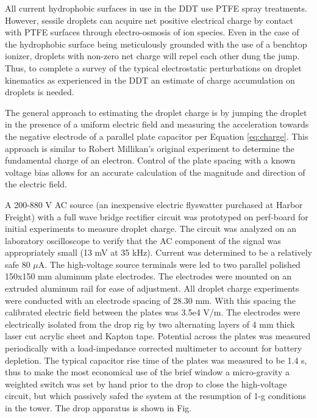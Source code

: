 \documentclass{jfm}
\begin{document}
All current hydrophobic surfaces in use in the DDT use PTFE spray treatments. However, sessile droplets can acquire net positive electrical charge by contact with PTFE surfaces through electro-osmosis of ion species. Even in the case of the hydrophobic surface being meticulously grounded with the use of a benchtop ionizer, droplets with non-zero net charge will repel each other dung the jump. Thus, to complete a survey of the typical electrostatic perturbations on droplet kinematics as experienced in the DDT an estimate of charge accumulation on droplets is needed.

The general approach to estimating the droplet charge is by jumping the droplet in the presence of a uniform electric field and measuring the acceleration towards the negative electrode of a parallel plate capacitor per Equation \ref{eq:charge}. This approach is similar to Robert Millikan's original experiment to determine the fundamental charge of an electron. Control of the plate spacing with a known voltage bias allows for an accurate calculation of the magnitude and direction of the electric field.

A 200-880 V AC source (an inexpensive electric flyswatter purchased at Harbor Freight) with a full wave bridge rectifier circuit was prototyped on perf-board for initial experiments to measure droplet charge. The circuit was analyzed on an laboratory oscilloscope to verify that the AC component of the signal was appropriately small (13 mV at 35 kHz). Current was determined to be a relatively safe 80 $\mu$A. The high-voltage source terminals were led to two parallel polished 150x150 mm aluminum plate electrodes. The electrodes were mounted on an extruded aluminum rail for ease of adjustment. All droplet charge experiments were conducted with an electrode spacing of 28.30 mm. With this spacing the calibrated electric field between the plates was 3.5e4 V/m. The electrodes were electrically isolated from the drop rig by two alternating layers of 4 mm thick laser cut acrylic sheet and Kapton tape. Potential across the plates was measured periodically with a load-impedance corrected multimeter to account for battery depletion. The typical capacitor rise time of the plates was measured to be 1.4 s, thus to make the most economical use of the brief window a micro-gravity a weighted switch was set by hand prior to the drop to close the high-voltage circuit, but which passively safed the system at the resumption of 1-g conditions in the tower. The drop apparatus is shown in Fig.
\end{document}
